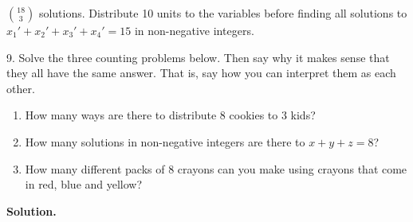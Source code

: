 \documentclass[10pt,]{book}
\theoremstyle{plain}
\theoremstyle{definition}
\theoremstyle{definition}
\theoremstyle{definition}
\numberwithin{equation}{section}
\begin{document}
\begin{exerciselist}
\({18 \choose 3}\) solutions. Distribute 10 units to the variables before finding all solutions to \(x_1' + x_2' + x_3' + x_4' = 15\) in non-negative integers.
%
\item[9.]\hypertarget{exercise-90}{}
Solve the three counting problems below. Then say why it makes sense that they all have the same answer. That is, say how you can interpret them as each other.
%
\leavevmode%
\begin{enumerate}[label=(\alph*)]
\item\hypertarget{li-598}{}
How many ways are there to distribute 8 cookies to 3 kids?
%
\item\hypertarget{li-599}{}
How many solutions in non-negative integers are there to \(x+y+z = 8\)?
%
\item\hypertarget{li-600}{}
How many different packs of 8 crayons can you make using crayons that come in red, blue and yellow?
%
\end{enumerate}
\par\smallskip
\par\smallskip
\noindent\textbf{Solution.}\hypertarget{solution-130}{}\quad


\end{exerciselist}
\end{document}
